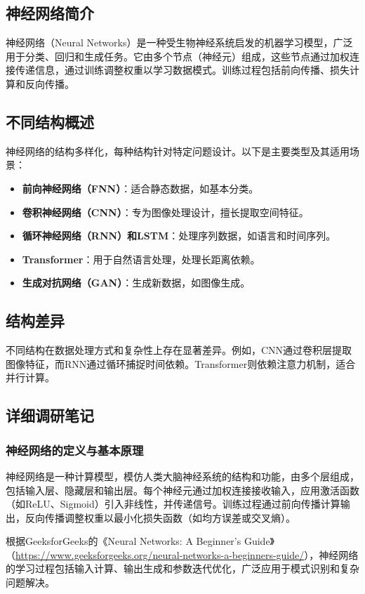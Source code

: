 \documentclass[UTF8]{report}
\theoremstyle{MyLineTheoremStyle} %
\theoremstyle{MyBlockTheoremStyle} %
\theoremstyle{MySubsubsectionStyle} %
\begin{document}
\subsection{神经网络简介}
神经网络（Neural Networks）是一种受生物神经系统启发的机器学习模型，广泛用于分类、回归和生成任务。它由多个节点（神经元）组成，这些节点通过加权连接传递信息，通过训练调整权重以学习数据模式。训练过程包括前向传播、损失计算和反向传播。

\subsection{不同结构概述}
神经网络的结构多样化，每种结构针对特定问题设计。以下是主要类型及其适用场景：
\begin{itemize}
    \item \textbf{前向神经网络（FNN）}：适合静态数据，如基本分类。
    \item \textbf{卷积神经网络（CNN）}：专为图像处理设计，擅长提取空间特征。
    \item \textbf{循环神经网络（RNN）和LSTM}：处理序列数据，如语言和时间序列。
    \item \textbf{Transformer}：用于自然语言处理，处理长距离依赖。
    \item \textbf{生成对抗网络（GAN）}：生成新数据，如图像生成。
\end{itemize}

\subsection{结构差异}
不同结构在数据处理方式和复杂性上存在显著差异。例如，CNN通过卷积层提取图像特征，而RNN通过循环捕捉时间依赖。Transformer则依赖注意力机制，适合并行计算。

\subsection{详细调研笔记}

\subsubsection{神经网络的定义与基本原理}
神经网络是一种计算模型，模仿人类大脑神经系统的结构和功能，由多个层组成，包括输入层、隐藏层和输出层。每个神经元通过加权连接接收输入，应用激活函数（如ReLU、Sigmoid）引入非线性，并传递信号。训练过程通过前向传播计算输出，反向传播调整权重以最小化损失函数（如均方误差或交叉熵）。

根据GeeksforGeeks的《Neural Networks: A Beginner's Guide》（\url{https://www.geeksforgeeks.org/neural-networks-a-beginners-guide/}），神经网络的学习过程包括输入计算、输出生成和参数迭代优化，广泛应用于模式识别和复杂问题解决。
\end{document}
